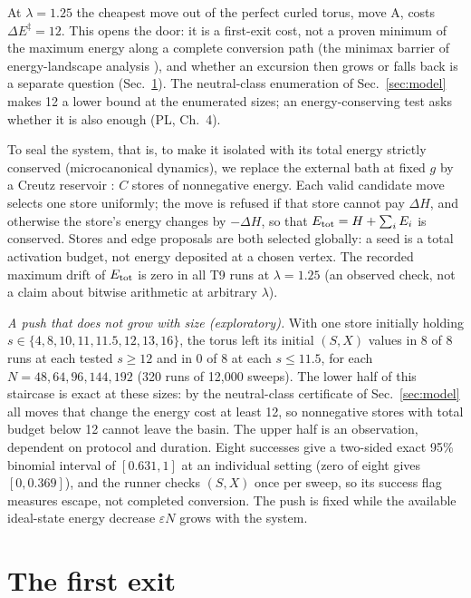 \documentclass[aps,pre,10pt,twocolumn,superscriptaddress,nofootinbib]{revtex4-2}
\begin{document}
At $\lambda=1.25$ the cheapest move out of the perfect curled torus, move A, costs
$\Delta E^\ddagger=12$. This opens the door: it is a first-exit cost, not a proven minimum of the
maximum energy along a complete conversion path (the minimax barrier of energy-landscape analysis
\cite{LLC26a}), and whether an excursion then grows or falls back is
a separate question (Sec.~\ref{sec:exit}). The neutral-class enumeration of Sec.~\ref{sec:model} makes
12 a lower bound at the enumerated sizes; an energy-conserving test asks whether it is also enough
(PL, Ch.~4).

To seal the system, that is, to make it isolated with its total energy strictly conserved
(microcanonical dynamics), we replace the external bath at fixed $g$ by a Creutz reservoir
\cite{Creutz83}: $C$ stores
of nonnegative energy. Each valid candidate move selects one store uniformly; the move is refused if
that store cannot pay $\Delta H$, and otherwise the store's energy changes by $-\Delta H$, so that
$E_{\rm tot}=H+\sum_iE_i$ is conserved. Stores and edge proposals are both selected globally: a seed
is a total activation budget, not energy deposited at a chosen vertex. The recorded maximum drift of
$E_{\rm tot}$ is zero in all T9 runs at $\lambda=1.25$ (an observed check, not a claim about bitwise
arithmetic at arbitrary $\lambda$).

\emph{A push that does not grow with size (exploratory).} With one store initially holding
$s\in\{4,8,10,11,11.5,12,13,16\}$, the torus left its initial $(S,X)$ values in 8 of 8 runs at each
tested $s\ge12$ and in 0 of 8 at each $s\le11.5$, for each $N=48,64,96,144,192$ (320 runs of 12,000
sweeps). The lower half of this staircase is exact at these sizes: by the neutral-class certificate
of Sec.~\ref{sec:model} all moves that change the energy cost at least 12, so nonnegative stores with total
budget below 12 cannot leave the basin. The upper half is an observation, dependent on protocol and
duration. Eight successes give a two-sided exact 95\% binomial interval of $[0.631,1]$ at an
individual setting (zero of eight gives $[0,0.369]$), and the runner checks $(S,X)$ once per sweep,
so its success flag measures escape, not completed conversion. The push is fixed while the available
ideal-state energy decrease $\varepsilon N$ grows with the system.

\section{The first exit}
\label{sec:exit}
\end{document}
